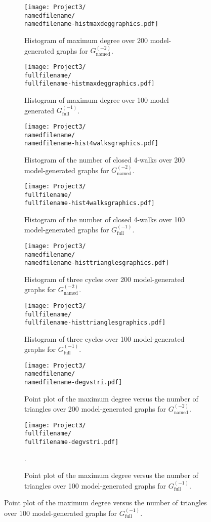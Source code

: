 \documentclass[11]{article}
\newcommand{\namedfilename}{namedminus2-2p}
\newcommand{\fullfilename}{fullminus1-2p}
\newcommand{\namedtwo}{G_{\textrm{named}}^{(-2)}}
\newcommand{\fullone}{G_{\textrm{full}}^{(-1)}}
\theoremstyle{remark}
\theoremstyle{definition}
\begin{document}
\begin{figure} [h!] 
  \centering
  \begin{subfigure}[t]{0.4\linewidth}
    \texttt{[image: Project3/\\namedfilename/\\namedfilename-histmaxdeggraphics.pdf]}
    \caption{Histogram of maximum degree over 200 model-generated graphs for $\namedtwo$.}
    \end{subfigure} \hfill
    \begin{subfigure}[t]{0.4\linewidth}
    \texttt{[image: Project3/\\fullfilename/\\fullfilename-histmaxdeggraphics.pdf]}

    \caption{Histogram of maximum degree over 100 model generated $\fullone$.}
    \end{subfigure} \hfill
    \begin{subfigure}[t]{0.4\linewidth}
    \texttt{[image: Project3/\\namedfilename/\\namedfilename-hist4walksgraphics.pdf]}
    \caption{Histogram of the number of closed 4-walks over 200 model-generated graphs for $\namedtwo$.} 
    \end{subfigure} \hfill
     \begin{subfigure}[t]{0.4\linewidth}
    \texttt{[image: Project3/\\fullfilename/\\fullfilename-hist4walksgraphics.pdf]}
    \caption{Histogram of the number of closed 4-walks over 100 model-generated graphs for $\fullone$.} 
    \end{subfigure} \hfill
    \begin{subfigure}[t]{0.4\linewidth}
    \texttt{[image: Project3/\\namedfilename/\\namedfilename-histtrianglesgraphics.pdf]}
    \caption{Histogram of three cycles over 200 model-generated graphs for $\namedtwo$.}
    \end{subfigure} \hfill
     \begin{subfigure}[t]{0.4\linewidth}
    \texttt{[image: Project3/\\fullfilename/\\fullfilename-histtrianglesgraphics.pdf]}
    \caption{Histogram of three cycles over 100 model-generated graphs for $\fullone$.}
    \end{subfigure} \hfill
    \begin{subfigure}[t]{0.4\linewidth}
    \texttt{[image: Project3/\\namedfilename/\\namedfilename-degvstri.pdf]}
    \caption{Point plot of the maximum degree versus the number of triangles over 200 model-generated graphs for $\namedtwo$.} 
    \label{sub:listmaxvstri}
    \end{subfigure} \hfill
    \begin{subfigure}[t]{0.4\linewidth}
    \texttt{[image: Project3/\\fullfilename/\\fullfilename-degvstri.pdf]}
    \caption{Point plot of the maximum degree versus the number of triangles over 100 model-generated graphs for $\fullone$.}
   \label{sub:listmaxvstrifull}.
    \end{subfigure} \hfill
    

\end{figure}
\end{document}
